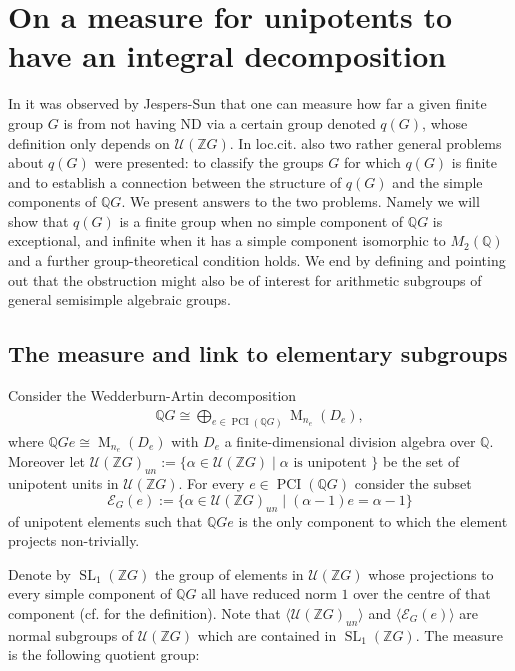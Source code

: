 \documentclass[a4paper,10pt]{amsart}
\theoremstyle{definition}
\theoremstyle{remark}
\newcommand{\SL}{\operatorname{SL}}
\newcommand{\Ma}{\operatorname{M}}
\newcommand\PCI{\operatorname{PCI}}
\newcommand{\U}{{\mathcal U}}
\newcommand{\Z}{{\mathbb Z}}
\newcommand{\Q}{{\mathbb Q}}
\begin{document}
\section{On a measure for unipotents to have an integral decomposition}\label{sec:GeneralOrders}

In \cite[Section 6]{JespersSun} it was observed by Jespers-Sun that one can measure how far a given finite group $G$ is from not having ND via a certain group denoted $q(G)$, whose definition only depends on $\U (\Z G)$. In loc.cit. also two rather general problems about $q(G)$ were presented: to classify the groups $G$ for which $q(G)$ is finite and to establish a connection between the structure of $q(G)$ and the simple components of $\Q G$. We present answers to the two problems. Namely we will show that $q(G)$ is a finite group when no simple component of $\Q G$ is exceptional, and infinite when it has a simple component isomorphic to $M_2(\Q)$ and a further group-theoretical condition holds. We end by defining and pointing out that the obstruction might also be of interest for arithmetic subgroups of general semisimple algebraic groups.

\subsection{The measure and link to elementary subgroups}\label{measure subsection}

Consider the Wedderburn-Artin decomposition 
\begin{align}\label{eq:WedderburnInSection4}
\Q G \cong \bigoplus_{e \in \PCI (\Q G)} \Ma_{n_e}(D_e),
\end{align}
 where $\Q Ge \cong \Ma_{n_e}(D_e)$ with $D_e$ a finite-dimensional division algebra over $\Q$. Moreover let $\U(\Z G)_{un} := \{ \alpha \in \U (\Z G) \mid \alpha \text{ is unipotent } \}$ be the set of unipotent units in $\U (\Z G)$. For every $e \in \PCI(\Q G)$ consider the subset 
$$\mathcal{E}_G(e) := \{ \alpha \in \U(\Z G)_{un} \mid (\alpha -1) e = \alpha -1\}$$
of unipotent elements such that $\Q Ge$ is the only component to which the element projects non-trivially. 

Denote by $\SL_1(\Z G)$ the group of elements in $\U(\Z G)$ whose projections to every simple component of $\Q G$ all have reduced norm $1$ over the centre of that component (cf. \cite[p. 67]{GRG1} for the definition). Note that $\langle  \U(\Z G)_{un} \rangle $ and $\langle \mathcal{E}_G(e) \rangle$ are normal subgroups of $\U (\Z G)$ which are contained in $\SL_1(\Z G)$. The measure is the following quotient group:
\end{document}
